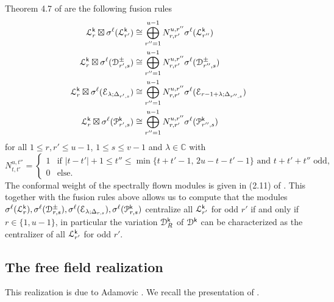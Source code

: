 \documentclass[a4paper, reqno]{amsart}
\theoremstyle{introTheorems}
\newcommand\cD{\mathcal{D}}
\renewcommand{\1}{\mathbbold{1}}
\begin{document}
Theorem 4.7 of \cite{Cr24} are the following fusion rules
\begin{align}\nonumber
\mathcal{L}_{r}^{\mathsf{k}} \boxtimes \sigma^{\ell}(\mathcal{L}_{r'}^{\mathsf{k}}) &\cong \bigoplus_{r''=1}^{u-1} N_{r,r'}^{u,r''} \sigma^{\ell}(\mathcal{L}_{r''}^{\mathsf{k}}) \\ \nonumber
\mathcal{L}_{r}^{\mathsf{k}} \boxtimes \sigma^{\ell}(\mathcal{D}_{r',s}^{\pm}) &\cong \bigoplus_{r''=1}^{u-1} N_{r,r'}^{u,r''} \sigma^{\ell}(\mathcal{D}_{r'',s}^{\pm}) \\ \nonumber
\mathcal{L}_{r}^{\mathsf{k}} \boxtimes \sigma^{\ell}(\mathcal{E}_{\lambda;\Delta_{r',s}}) &\cong \bigoplus_{r''=1}^{u-1} N_{r,r'}^{u,r''} \sigma^{\ell}(\mathcal{E}_{r-1+\lambda;\Delta_{r'',s}}) \\
\mathcal{L}_{r}^{\mathsf{k}} \boxtimes \sigma^{\ell}(\mathcal{P}_{r',s}^{\mathsf{k}}) &\cong \bigoplus_{r''=1}^{u-1} N_{r,r'}^{u,r''} \sigma^{\ell}(\mathcal{P}_{r'',s}^{\mathsf{k}}) \nonumber
\end{align}
for all $1 \le r, r' \le u - 1$, $1 \le s \le v - 1$ and $\lambda \in \mathbb{C}$ with
\begin{equation}\nonumber
N_{t,t'}^{u,t''} =
\begin{cases}
1 & \text{if } |t-t'|+1 \le t'' \le \min\{t+t'-1,\, 2u-t-t'-1\} \text{ and } t+t'+t'' \text{ odd}, \\
0 & \text{else}.
\end{cases}
\end{equation}
The conformal weight of the spectrally flown modules is given in (2.11) of \cite{CR1}. This together with the fusion rules above allows us to compute that the modules $\sigma^{\ell}(\mathcal{L}_{r}^{\mathsf{k}}), \sigma^{\ell}(\mathcal{D}_{r,s}^{\pm}),  \sigma^{\ell}(\mathcal{E}_{\lambda;\Delta_{r,s}}), \sigma^{\ell}(\mathcal{P}_{r,s}^{\mathsf{k}})$ centralize all $\mathcal{L}_{r'}^{\mathsf{k}}$ for odd $r'$ if and only if $r \in \{ 1, u-1 \}$, in particular the variation $\cD^\k_R$ of $\cD^\k$ can be characterized as the centralizer of all $\mathcal{L}_{r'}^{\mathsf{k}}$ for odd $r'$.


\subsection{The free field realization}\label{subsec:sl2freefield}

This realization is due to Adamovic \cite{A}.
We recall the presentation of \cite{CMY1}.  

\bigskip
\end{document}
